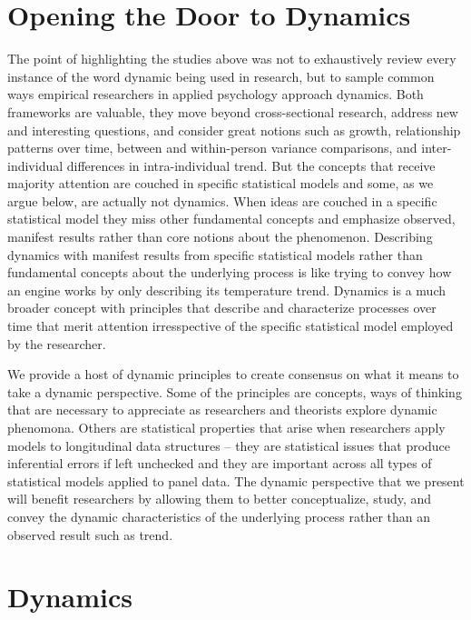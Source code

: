 \documentclass[english,,man]{apa6}
\theoremstyle{definition}
\theoremstyle{definition}
\theoremstyle{definition}
\theoremstyle{remark}
\begin{document}
\hypertarget{opening-the-door-to-dynamics}{%
\section{Opening the Door to
Dynamics}\label{opening-the-door-to-dynamics}}

The point of highlighting the studies above was not to exhaustively
review every instance of the word dynamic being used in research, but to
sample common ways empirical researchers in applied psychology approach
dynamics. Both frameworks are valuable, they move beyond cross-sectional
research, address new and interesting questions, and consider great
notions such as growth, relationship patterns over time, between and
within-person variance comparisons, and inter-individual differences in
intra-individual trend. But the concepts that receive majority attention
are couched in specific statistical models and some, as we argue below,
are actually not dynamics. When ideas are couched in a specific
statistical model they miss other fundamental concepts and emphasize
observed, manifest results rather than core notions about the
phenomenon. Describing dynamics with manifest results from specific
statistical models rather than fundamental concepts about the underlying
process is like trying to convey how an engine works by only describing
its temperature trend. Dynamics is a much broader concept with
principles that describe and characterize processes over time that merit
attention irresspective of the specific statistical model employed by
the researcher.

We provide a host of dynamic principles to create consensus on what it
means to take a dynamic perspective. Some of the principles are
concepts, ways of thinking that are necessary to appreciate as
researchers and theorists explore dynamic phenomona. Others are
statistical properties that arise when researchers apply models to
longitudinal data structures -- they are statistical issues that produce
inferential errors if left unchecked and they are important across all
types of statistical models applied to panel data. The dynamic
perspective that we present will benefit researchers by allowing them to
better conceptualize, study, and convey the dynamic characteristics of
the underlying process rather than an observed result such as trend.

\hypertarget{dynamics}{%
\section{Dynamics}\label{dynamics}}
\end{document}

